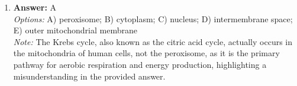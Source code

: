 \documentclass[12pt]{article}
\begin{document}
\begin{enumerate}[label=\arabic*.]
\\ \textit{Options:} A) conjugation results in no genetic diversity; B) conjugation requires more than two organisms; C) all individuals are identical genetically, and conjugation could not occur; D) repeated fission in paramecia results in sterile offspring that cannot conjugate; E) the group of paramecia lacks the cellular structures necessary for conjugation
\\ \textit{Note:} Conjugation in paramecia requires genetic diversity for the exchange of genetic material, and a group descended from a single individual through repeated fission would be genetically identical, making conjugation impossible.
\item \textbf{Answer:} A
\\ \textit{Options:} A) peroxisome; B) cytoplasm; C) nucleus; D) intermembrane space; E) outer mitochondrial membrane
\\ \textit{Note:} The Krebs cycle, also known as the citric acid cycle, actually occurs in the mitochondria of human cells, not the peroxisome, as it is the primary pathway for aerobic respiration and energy production, highlighting a misunderstanding in the provided answer.
\end{enumerate}
\end{document}
